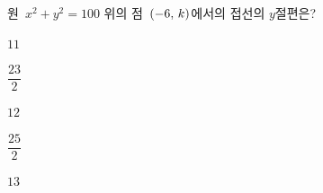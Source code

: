 원~$x^2+y^2=100$ 위의 점~$(-6,\mkern3mu k)$에서의 접선의 $y$절편은? 
\begin{choices32}{\rule[-3ex]{0pt}{8ex}$11$}{\rule[-3ex]{0pt}{8ex}$\dfrac{23}{2}$}{\rule[-3ex]{0pt}{8ex}$12$}{\rule[-3ex]{0pt}{8ex}$\dfrac{25}{2}$}{\rule[-3ex]{0pt}{8ex}$13$}\end{choices32}
